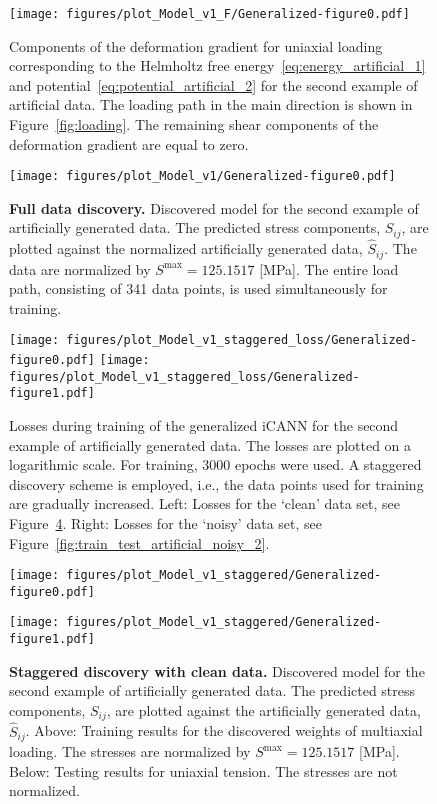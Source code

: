 %
\begin{figure}[h]
    \centering
    \texttt{[image: figures/plot\_Model\_v1\_F/Generalized-figure0.pdf]}
    \caption{Components of the deformation gradient for uniaxial loading corresponding to the Helmholtz free energy~\eqref{eq:energy_artificial_1} and potential~\eqref{eq:potential_artificial_2} for the second example of artificial data.
    The loading path in the main direction is shown in Figure~\ref{fig:loading}. The remaining shear components of the deformation gradient are equal to zero.}
    \label{fig:results_artificial_2_deformation}
\end{figure}
%
\begin{figure}[h]
    \centering
    \texttt{[image: figures/plot\_Model\_v1/Generalized-figure0.pdf]}
    \caption{\textbf{Full data discovery.} Discovered model for the second example of artificially generated data. The predicted stress components, \( S_{ij} \), are plotted against the normalized artificially generated data, \( \hat{S}_{ij} \). The data are normalized by \( S^{\text{max}} = 125.1517 \) [MPa]. The entire load path, consisting of 341 data points, is used simultaneously for training.}
    \label{fig:train_full_artificial_2}
\end{figure}
%
\begin{figure}[h]
    \centering
    \texttt{[image: figures/plot\_Model\_v1\_staggered\_loss/Generalized-figure0.pdf]}
    \texttt{[image: figures/plot\_Model\_v1\_staggered\_loss/Generalized-figure1.pdf]}
    \caption{Losses during training of the generalized iCANN for the second example of artificially generated data. The losses are plotted on a logarithmic scale. For training, $3000$ epochs were used. A staggered discovery scheme is employed, i.e., the data points used for training are gradually increased. Left: Losses for the `clean' data set, see Figure~\ref{fig:train_test_artificial_2}. Right: Losses for the `noisy' data set, see Figure~\ref{fig:train_test_artificial_noisy_2}.}
    \label{fig:loss_artificial_2}
\end{figure}
%
\begin{figure}[h]
    \centering
    \texttt{[image: figures/plot\_Model\_v1\_staggered/Generalized-figure0.pdf]}

    \texttt{[image: figures/plot\_Model\_v1\_staggered/Generalized-figure1.pdf]}
    \caption{\textbf{Staggered discovery with clean data.} Discovered model for the second example of artificially generated data. The predicted stress components, $S_{ij}$, are plotted against the artificially generated data, $\hat{S}_{ij}$. Above: Training results for the discovered weights of multiaxial loading. The stresses are normalized by \( S^{\text{max}} = 125.1517 \) [MPa]. Below: Testing results for uniaxial tension. The stresses are not normalized.}
    \label{fig:train_test_artificial_2}
\end{figure}
